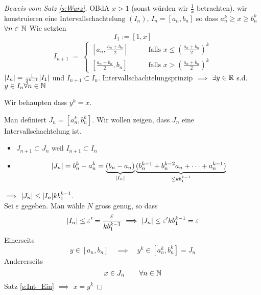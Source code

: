 
\begin{proof}[Beweis vom Satz \ref{s:Wurz}]
  OBdA $x>1$ (sonst würden wir $\frac{1}{x}$ betrachten). 
wir konstruieren eine Intervallschachtelung $(I_n)$, $I_n = [a_n, b_n]$ so dass $a_n^k \geq x \geq b_n^k$
$\forall n\in \mathbb{N}$  Wie setzten
$$
I_1:=[1,x]
$$
$$
I_{n+1} \;=\; \left\{\begin{array}{ll}
      \left[ a_n, \frac{a_n+b_n}{2} \right] & \qquad\mbox{falls } x \leq \left( \frac{a_n+b_n}{2} \right)^k\\
      \left[ \frac{a_n+b_n}{2}, b_n \right] & \qquad\mbox{falls } x > \left( \frac{a_n+b_n}{2} \right)^k
    \end{array}\right.
$$
$\mathopen| I_n \mathclose| = \frac{1}{2^{n-1}}\mathopen| I_1 \mathclose|$ und $I_{n+1}\subset I_n$.
Intervallschachtelungsprinzip $\implies$ $\exists y\in\mathbb{R}$ s.d. $y\in I_n \forall n\in\mathbb{N}$ 

Wir behaupten dass $y^k=x$.

Man definiert $J_n=[a_n^k, b_n^k]$. Wir wollen zeigen, dass $J_n$ eine Intervallschachtelung ist.
  \begin{itemize}
    \item $J_{n+1}\subset J_n$ weil $I_{n+1}\subset I_n$
    \item \[\mathopen| J_n \mathclose| = b_n^k-a_n^k = \underbrace{\left( b_n - a_n \right)}_{\mathopen| I_n \mathclose|} \underbrace{(b_n^{k-1}+b_n^{k-2}a_n + \cdots + a_n^{k-1})}_{\leq k b_1^{k-1}}\]
  \end{itemize}
  $\implies$ $\mathopen| J_n \mathclose|\leq \mathopen| I_n \mathclose|k b_1^{k-1}$.\\
  Sei $\varepsilon$ gegeben. Man wähle $N$ gross genug, so dass
  \[\mathopen| I_n \mathclose|\leq\varepsilon'=\frac{\varepsilon}{kb_1^{k-1}}\implies\mathopen| J_n \mathclose|\leq \varepsilon' kb_1^{k-1}=\varepsilon\]
  Einerseits
  \[y\in\left[ a_n,b_n \right]\quad\implies\quad y^k\in\left[ a_n^k, b_n^k \right]=J_n\]
  Andererseits
  \[x\in J_n\qquad\forall n\in\mathbb{N}\]
Satz \ref{s:Int_Ein} $\implies$ $x=y^k$
\end{proof}
